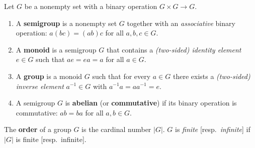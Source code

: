 Let $G$ be a nonempty set with a binary operation $G \times G \to G$.
\begin{enumerate}
\item A \textbf{semigroup} is a nonempty set $G$ together with an \textit{associative} binary operation: $a(bc) = (ab)c$ for all $a,b,c \in G$.
\item A \textbf{monoid} is a semigroup $G$ that contains a \textit{(two-sided) identity element} $e \in G$ such that $ae = ea = a$ for all $a \in G$.
\item A \textbf{group} is a monoid $G$ such that for every $a \in G$ there exists a \textit{(two-sided) inverse element} $a^{-1} \in G$ with $a^{-1}a = aa^{-1} = e$.
\item A semigroup $G$ is \textbf{abelian} (or \textbf{commutative}) if its binary operation is commutative: $ab = ba$ for all $a,b \in G$.
\end{enumerate}
The \textbf{order} of a group $G$ is the cardinal number $|G|$. $G$ is \textit{finite} [resp.\ \textit{infinite}] if $|G|$ is finite [resp.\ infinite].
